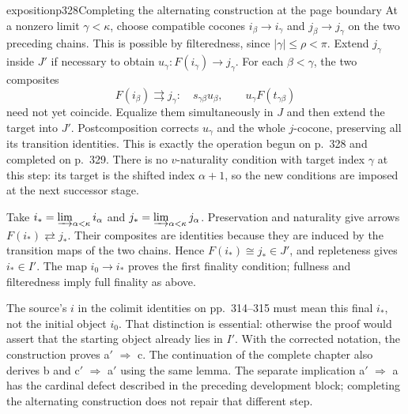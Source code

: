 \begin{dcomment}{exposition}{p328}{Completing the alternating construction at the page boundary}
At a nonzero limit $\gamma<\kappa$, choose compatible cocones $i_\beta\to i_\gamma$ and $j_\beta\to j_\gamma$ on the two preceding chains. This is possible by filteredness, since $|\gamma|\leq\rho<\pi$. Extend $j_\gamma$ inside $J'$ if necessary to obtain $u_\gamma:F(i_\gamma)\to j_\gamma$. For each $\beta<\gamma$, the two composites
\[
 F(i_\beta)\rightrightarrows j_\gamma:\quad
 s_{\gamma\beta}u_\beta,\qquad u_\gamma F(t_{\gamma\beta})
\]
need not yet coincide. Equalize them simultaneously in $J$ and then extend the target into $J'$. Postcomposition corrects $u_\gamma$ and the whole $j$-cocone, preserving all its transition identities. This is exactly the operation begun on p.~328 and completed on p.~329. There is no $v$-naturality condition with target index $\gamma$ at this step: its target is the shifted index $\alpha+1$, so the new conditions are imposed at the next successor stage.

Take $i_*=\varinjlim_{\alpha<\kappa}i_\alpha$ and $j_*=\varinjlim_{\alpha<\kappa}j_\alpha$. Preservation and naturality give arrows $F(i_*)\rightleftarrows j_*$. Their composites are identities because they are induced by the transition maps of the two chains. Hence $F(i_*)\cong j_*\in J'$, and repleteness gives $i_*\in I'$. The map $i_0\to i_*$ proves the first finality condition; fullness and filteredness imply full finality as above.

The source's $i$ in the colimit identities on pp.~314--315 must mean this final $i_*$, not the initial object $i_0$. That distinction is essential: otherwise the proof would assert that the starting object already lies in $I'$. With the corrected notation, the construction proves a$'$ $\Rightarrow$ c. The continuation of the complete chapter also derives b and c$'$ $\Rightarrow$ a$'$ using the same lemma. The separate implication a$'$ $\Rightarrow$ a has the cardinal defect described in the preceding development block; completing the alternating construction does not repair that different step.
\end{dcomment}
